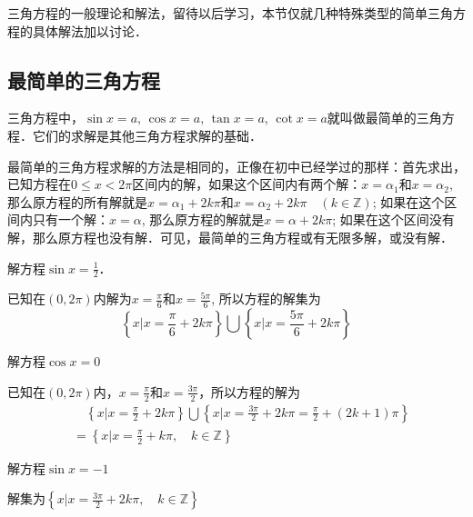 三角方程的一般理论和解法，留待以后学习，本节仅就几种特殊类型的简单三角方程的具体解法加以讨论．

\subsection{最简单的三角方程}

三角方程中，$\sin x=a$,
$\cos x=a$, $\tan x=a$, $\cot x=a$就叫做最简单的三角方程．它们的求解是其他三角方程求解的基础．

最简单的三角方程求解的方法是相同的，正像在初中已经学过的那样：首先求出，已知方程在$0\le x<2\pi$区间内的解，如果这个区间内有两个解：$x=\alpha_1$和$x=\alpha_2$, 那么原方程的所有解就是$x=\alpha_1+2k\pi$和$x=\alpha_2+2k\pi\quad (k\in\mathbb{Z})$; 如果在这个区间内只有一个解：$x=\alpha$, 那么原方程的解就是$x=\alpha+2k\pi$; 如果在这个区间没有解，那么原方程也没有解．可见，最简单的三角方程或有无限多解，或没有解．


\begin{example}
    解方程$\sin x=\frac{1}{2}$．
\end{example}

\begin{solution}
    已知在$(0, 2\pi)$内解为$x=\frac{\pi}{6}$和$x=\frac{5\pi}{6}$,
所以方程的解集为
\[\left\{x\Big|x=\frac{\pi}{6}+2k\pi\right\} \bigcup \left\{x\Big|x=\frac{5\pi}{6}+2k\pi\right\}\]
\end{solution}


\begin{example}
    解方程$\cos x=0$
\end{example}

\begin{solution}
    已知在$(0, 2\pi)$内，$x=\frac{\pi}{2}$和$x=\frac{3\pi}{2}$，所以方程的解为
    \[\begin{split}
 &\quad        \left\{x\Big|x=\frac{\pi}{2}+2k\pi\right\} \bigcup \left\{x\Big|x=\frac{3\pi}{2}+2k\pi=\frac{\pi}{2}+(2k+1)\pi\right\}\\
        &=\left\{x\Big|x=\frac{\pi}{2}+k\pi,\quad k\in\mathbb{Z}\right\}
    \end{split} \]
\end{solution}


\begin{example}
    解方程$\sin x=-1$
\end{example}

\begin{solution}
    解集为$\left\{x\Big|x=\frac{3\pi}{2}+2k\pi,\quad k\in\mathbb{Z}\right\}$
\end{solution}

